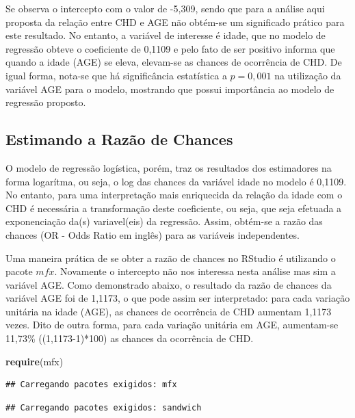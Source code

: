 \documentclass[12pt,brazil,]{book}
\newenvironment{Shaded}{\begin{snugshade}}{\end{snugshade}}
\newcommand{\KeywordTok}[1]{\textcolor[rgb]{0.13,0.29,0.53}{\textbf{#1}}}
\newcommand{\NormalTok}[1]{#1}
\begin{document}
Se observa o intercepto com o valor de -5,309, sendo que para a análise
aqui proposta da relação entre CHD e AGE não obtém-se um significado
prático para este resultado. No entanto, a variável de interesse é
idade, que no modelo de regressão obteve o coeficiente de 0,1109 e pelo
fato de ser positivo informa que quando a idade (AGE) se eleva,
elevam-se as chances de ocorrência de CHD. De igual forma, nota-se que
há significância estatística a \(p=0,001\) na utilização da variável AGE
para o modelo, mostrando que possui importância ao modelo de regressão
proposto.

\hypertarget{estimando-a-razao-de-chances}{%
\subsection{Estimando a Razão de
Chances}\label{estimando-a-razao-de-chances}}

O modelo de regressão logística, porém, traz os resultados dos
estimadores na forma logarítma, ou seja, o log das chances da variável
idade no modelo é 0,1109. No entanto, para uma interpretação mais
enriquecida da relação da idade com o CHD é necessária a transformação
deste coeficiente, ou seja, que seja efetuada a exponenciação da(s)
variavel(eis) da regressão. Assim, obtém-se a razão das chances (OR -
Odds Ratio em inglês) para as variáveis independentes.

Uma maneira prática de se obter a razão de chances no RStudio é
utilizando o pacote \(mfx\). Novamente o intercepto não nos interessa
nesta análise mas sim a variável AGE. Como demonstrado abaixo, o
resultado da razão de chances da variável AGE foi de 1,1173, o que pode
assim ser interpretado: para cada variação unitária na idade (AGE), as
chances de ocorrência de CHD aumentam 1,1173 vezes. Dito de outra forma,
para cada variação unitária em AGE, aumentam-se 11,73\% ((1,1173-1)*100)
as chances da ocorrência de CHD.

\begin{Shaded}
\begin{Highlighting}[]
\KeywordTok{require}\NormalTok{(mfx)}
\end{Highlighting}
\end{Shaded}

\begin{verbatim}
## Carregando pacotes exigidos: mfx
\end{verbatim}

\begin{verbatim}
## Carregando pacotes exigidos: sandwich
\end{verbatim}
\end{document}
